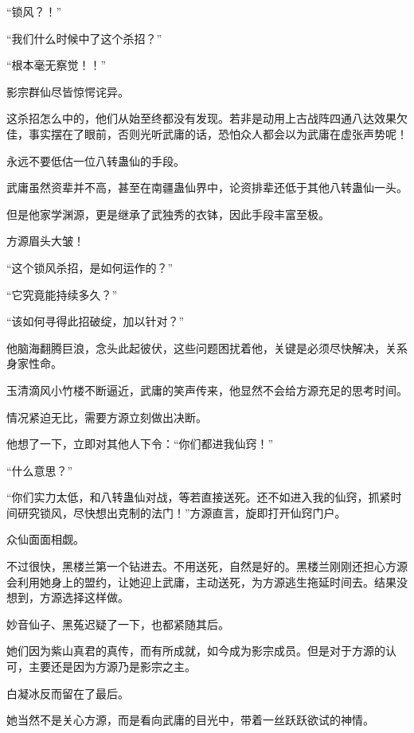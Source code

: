 
\begin{this_body}



“锁风？！”

“我们什么时候中了这个杀招？”

“根本毫无察觉！！”

影宗群仙尽皆惊愕诧异。

这杀招怎么中的，他们从始至终都没有发现。若非是动用上古战阵四通八达效果欠佳，事实摆在了眼前，否则光听武庸的话，恐怕众人都会以为武庸在虚张声势呢！

永远不要低估一位八转蛊仙的手段。

武庸虽然资辈并不高，甚至在南疆蛊仙界中，论资排辈还低于其他八转蛊仙一头。

但是他家学渊源，更是继承了武独秀的衣钵，因此手段丰富至极。

方源眉头大皱！

“这个锁风杀招，是如何运作的？”

“它究竟能持续多久？”

“该如何寻得此招破绽，加以针对？”

他脑海翻腾巨浪，念头此起彼伏，这些问题困扰着他，关键是必须尽快解决，关系身家性命。

玉清滴风小竹楼不断逼近，武庸的笑声传来，他显然不会给方源充足的思考时间。

情况紧迫无比，需要方源立刻做出决断。

他想了一下，立即对其他人下令：“你们都进我仙窍！”

“什么意思？”

“你们实力太低，和八转蛊仙对战，等若直接送死。还不如进入我的仙窍，抓紧时间研究锁风，尽快想出克制的法门！”方源直言，旋即打开仙窍门户。

众仙面面相觑。

不过很快，黑楼兰第一个钻进去。不用送死，自然是好的。黑楼兰刚刚还担心方源会利用她身上的盟约，让她迎上武庸，主动送死，为方源逃生拖延时间去。结果没想到，方源选择这样做。

妙音仙子、黑菟迟疑了一下，也都紧随其后。

她们因为紫山真君的真传，而有所成就，如今成为影宗成员。但是对于方源的认可，主要还是因为方源乃是影宗之主。

白凝冰反而留在了最后。

她当然不是关心方源，而是看向武庸的目光中，带着一丝跃跃欲试的神情。


\end{this_body}
